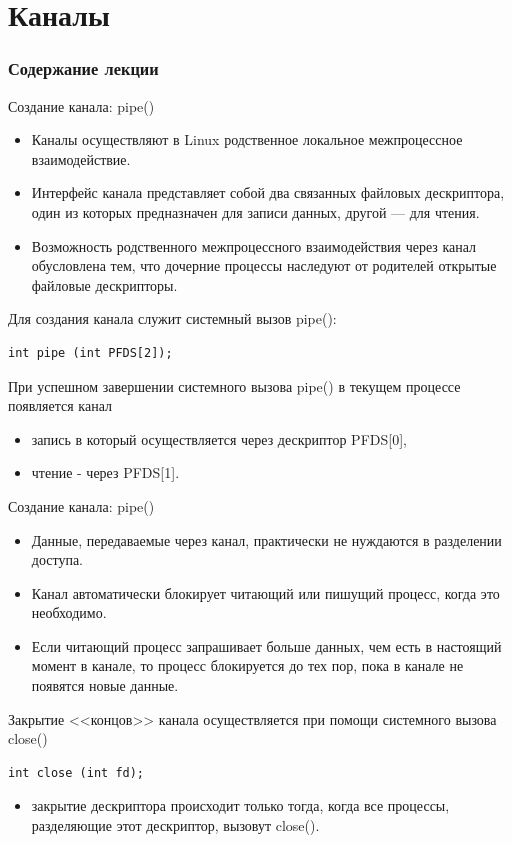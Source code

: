 \documentclass[xcolor=table]{beamer}
\begin{document}
\section{Каналы}

\begin{frame}
  \frametitle{Содержание лекции}
  \tableofcontents[current]
\end{frame}

\begin{frame}[fragile]{Создание канала: pipe()}
	\begin{itemize}
		\item Каналы осуществляют в Linux родственное локальное межпроцессное взаимодействие. 
		\item Интерфейс канала представляет собой два связанных файловых дескриптора, один из которых предназначен для записи данных, другой — для чтения. 
		\item Возможность родственного межпроцессного взаимодействия через канал обусловлена тем, что дочерние процессы наследуют от родителей открытые файловые дескрипторы.
	\end{itemize}
	Для создания канала служит системный вызов pipe():
	\begin{verbatim}
int pipe (int PFDS[2]);
	\end{verbatim}
	При успешном завершении системного вызова pipe() в текущем процессе появляется канал
	\begin{itemize}
		\item запись в который осуществляется через дескриптор PFDS[0], 
		\item чтение - через PFDS[1]. 
	\end{itemize}
\end{frame}

\begin{frame}[fragile]{Создание канала: pipe()}
	\begin{itemize}
		\item Данные, передаваемые через канал, практически не нуждаются в разделении доступа. 
		\item Канал автоматически блокирует читающий или пишущий процесс, когда это необходимо. 
		\item Если читающий процесс запрашивает больше данных, чем есть в настоящий момент в канале, то процесс блокируется до тех пор, пока в канале не появятся новые данные.
	\end{itemize}
	Закрытие <<концов>> канала осуществляется при помощи системного вызова close()
	\begin{verbatim}
int close (int fd);
	\end{verbatim}
	\begin{itemize}
	\item закрытие дескриптора происходит только тогда, когда все процессы, разделяющие этот дескриптор, вызовут close().
	\end{itemize}
\end{frame}
\end{document}

